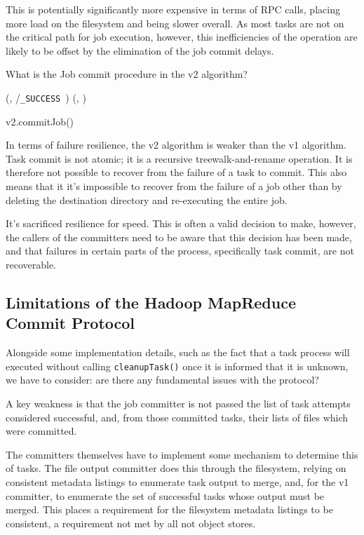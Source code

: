\documentclass[conference]{IEEEtran}
\newcommand{\SUCCESS}{\texttt{\_SUCCESS}\ }
\begin{document}
This is potentially significantly more expensive in terms of RPC
calls, placing more load on the filesystem and being slower overall.
As most tasks are not on the critical path for job execution, however,
this inefficiencies of the operation are likely to be offset by the
elimination of the job commit delays.

What is the Job commit procedure in the v2 algorithm?


\begin{procedure*}
\FileOutputCommitVars

  \touch(\fs, \dest/\SUCCESS)\;
  \delete(\fs, \temp)\;
\caption{v2.commitJob()}
\end{procedure*}

In terms of failure resilience, the v2 algorithm is weaker than the v1 algorithm.
Task commit is not atomic;
it is a recursive treewalk-and-rename operation.
It is therefore not possible to recover from the failure of a task to commit.
This also means that it it's impossible to recover from the failure of a job other
than by deleting the destination directory and re-executing the entire job.

It's sacrificed resilience for speed.
This is often a valid decision to make, however, the callers of the committers
need to be aware that this decision has been made, and that failures in
certain parts of the process, specifically task commit, are not recoverable.

\subsection{Limitations of the Hadoop MapReduce Commit Protocol}
\label{subsec:limitationsOfTheHadoopMapreduceCommitProtocol}

Alongside some implementation details, such as the fact that a task process
will executed without calling \texttt{cleanupTask()} once it is informed that it
is unknown, we have to consider: are there any fundamental issues with
the protocol?

A key weakness is that the job committer is not passed the list of task
attempts considered successful, and, from those committed tasks, their
lists of files which were committed.

The committers themselves have to implement some mechanism to determine this
of tasks.
The file output committer does this through the filesystem, relying on consistent
metadata listings to enumerate task output to merge, and, for the v1 committer,
to enumerate the set of successful tasks whose output must be merged.
This places a requirement for the filesystem metadata listings to be consistent,
a requirement not met by all not object stores.
\end{document}
